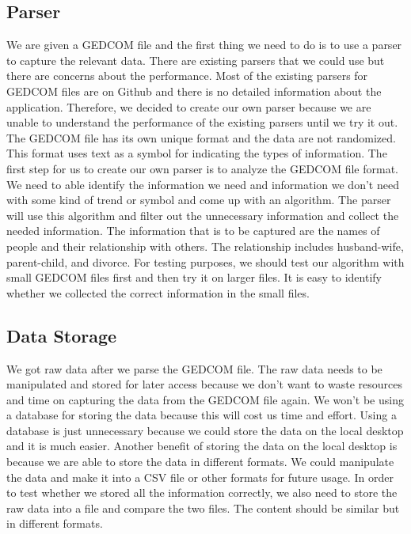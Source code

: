 \documentclass[onecolumn, draftclsnofoot, 10pt, compsoc]{IEEEtran}
\begin{document}
\subsection{Parser}
\begin{singlespace}
We are given a GEDCOM file and the first thing we need to do is to use a parser to capture the relevant data. There are existing parsers that we could use but there are concerns about the performance. Most of the existing parsers for GEDCOM files are on Github and there is no detailed information about the application. Therefore, we decided to create our own parser because we are unable to understand the performance of the existing parsers until we try it out.
\newline
\newline
The GEDCOM file has its own unique format and the data are not randomized. This format uses text as a symbol for indicating the types of information. The first step for us to create our own parser is to analyze the GEDCOM file format. We need to able identify the information we need and information we don't need with some kind of trend or symbol and come up with an algorithm. The parser will use this algorithm and filter out the unnecessary information and collect the needed information. The information that is to be captured are the names of people and their relationship with others. The relationship includes husband-wife, parent-child, and divorce. 
\newline
\newline
For testing purposes, we should test our algorithm with small GEDCOM files first and then try it on larger files. It is easy to identify whether we collected the correct information in the small files. 
\end{singlespace}

\subsection{Data Storage}
\begin{singlespace}
We got raw data after we parse the GEDCOM file. The raw data needs to be manipulated and stored for later access because we don't want to waste resources and time on capturing the data from the GEDCOM file again. We won't be using a database for storing the data because this will cost us time and effort. Using a database is just unnecessary because we could store the data on the local desktop and it is much easier. Another benefit of storing the data on the local desktop is because we are able to store the data in different formats. We could manipulate the data and make it into a CSV file or other formats for future usage. 
\newline
\newline
In order to test whether we stored all the information correctly, we also need to store the raw data into a file and compare the two files. The content should be similar but in different formats. 
\end{singlespace}
\end{document}
